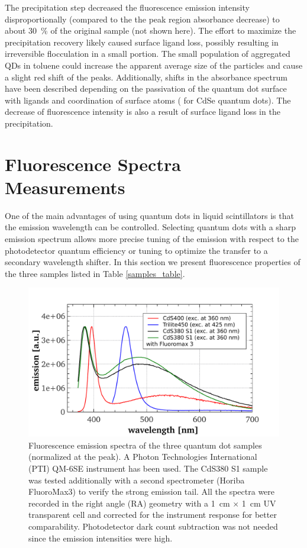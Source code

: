 \documentclass[cits]{JINST}
\begin{document}
The precipitation step decreased the fluorescence emission intensity disproportionally (compared to the the peak region absorbance decrease) to about 30~\% of the original sample (not shown here). The effort to maximize the precipitation recovery likely caused surface ligand loss, possibly resulting in irreversible flocculation in a small portion. The small population of aggregated QDs in toluene could increase the apparent average size of the particles and cause a slight red shift of the peaks. Additionally, shifts in the absorbance spectrum have been described depending on the passivation of the quantum dot surface with ligands and coordination of surface atoms (\cite{inerbaev} for CdSe quantum dots). The decrease of fluorescence intensity is also a result of surface ligand loss in the precipitation. 

\section{Fluorescence Spectra Measurements}\label{Fluorescence_section}
One of the main advantages of using quantum dots in liquid scintillators is that the emission wavelength can be controlled. Selecting quantum dots with a sharp emission spectrum allows more precise tuning of the emission with respect to the photodetector quantum efficiency or tuning to optimize the transfer to a secondary wavelength shifter. In this section we present fluorescence properties of the three samples listed in Table \ref{samples_table}. 

\begin{figure}
      \begin{center}
        \includegraphics[scale=0.42]{graphs/publication_emission_comparison_update.pdf}
        \caption[]{Fluorescence emission spectra of the three quantum dot samples (normalized at the peak). A Photon Technologies International (PTI) QM-6SE instrument has been used. The CdS380 S1 sample was tested additionally with a second spectrometer (Horiba FluoroMax3) to verify the strong emission tail. All the spectra were recorded in the right angle (RA) geometry with a 1~cm $\times$ 1~cm UV transparent cell and corrected for the instrument response for better comparability. Photodetector dark count subtraction was not needed since the emission intensities were high. \label{emission_comp}}
        \end{center}
\end{figure}
\end{document}
